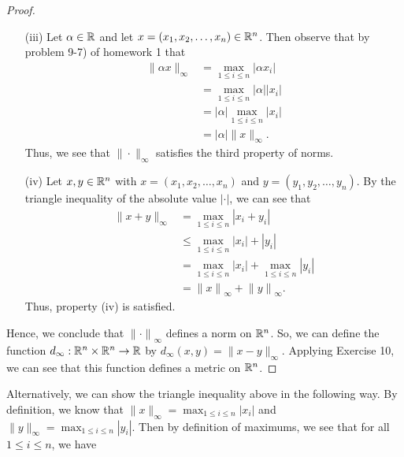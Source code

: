\documentclass{article}
\begin{document}
\begin{enumerate}
\begin{proof}
\begin{enumerate}
           \item[(iii)] Let \( \alpha \in \mathbb{R}  \) and let \( x = ({x}_{1}, {x}_{2}, \dots , {x}_{n}) \in \mathbb{R}^{n} \). Then observe that by problem 9-7) of homework 1 that   
                \begin{align*}
                    \|\alpha x \|_{\infty  } &= \max_{1 \leq i \leq n} | \alpha {x}_{i} |   \\
                                             &= \max_{1 \leq i \leq n} | \alpha | | {x}_{i} | \tag{Problem 1} \\
                                             &= | \alpha | \max_{1 \leq i \leq n} | {x}_{i} | \tag{Problem 9-7) of Homework 1}\\
                                             &= | \alpha | \|x\|_{\infty}.
                \end{align*}
                Thus, we see that \( \|\cdot\|_{\infty } \) satisfies the third property of norms.
            \item[(iv)] Let \( x,y \in \mathbb{R}^{n} \) with \( x = ({x}_{1}, {x}_{2}, \dots, {x}_{n}) \) and \( y = ({y}_{1}, {y}_{2}, \dots, {y}_{n}) \). By the triangle inequality of the absolute value \( | \cdot |  \), we can see that 
                \begin{align*}
                    \|x + y\|_{\infty } &= \max_{1 \leq i \leq n} | {x}_{i} + {y}_{i} |  \\
                                        &\leq \max_{1 \leq i \leq n} | {x}_{i} |  + | {y}_{i} |  \\
                                        &= \max_{1 \leq i \leq n} | {x}_{i} |  + \max_{1 \leq i \leq n } | {y}_{i} | \\
                                        &= {\|x\|}_{\infty } + {\|y\|}_{\infty }.
                \end{align*}
                Thus, property (iv) is satisfied.
       \end{enumerate}
       Hence, we conclude that \( {\|\cdot\|}_{\infty } \) defines a norm on \( \mathbb{R}^{n} \). So, we can define the function \( {d}_{\infty } : \mathbb{R}^{n} \times \mathbb{R}^{n} \to \mathbb{R}  \) by \( {d}_{\infty }(x,y) = \|x - y\|_{\infty } \). Applying Exercise 10, we can see that this function defines a metric on \( \mathbb{R}^{n} \).
    \end{proof}
    \begin{remark}
        Alternatively, we can show the triangle inequality above in the following way. By definition, we know that \( \|x\|_{\infty } = \max_{1 \leq i \leq n} | {x}_{i} |   \) and \( \|y\|_{\infty} = \max_{1 \leq i \leq n} | {y}_{i} |  \). Then by definition of maximums, we see that for all \( 1 \leq i \leq n  \), we have

\end{remark}
\end{enumerate}
\end{document}
